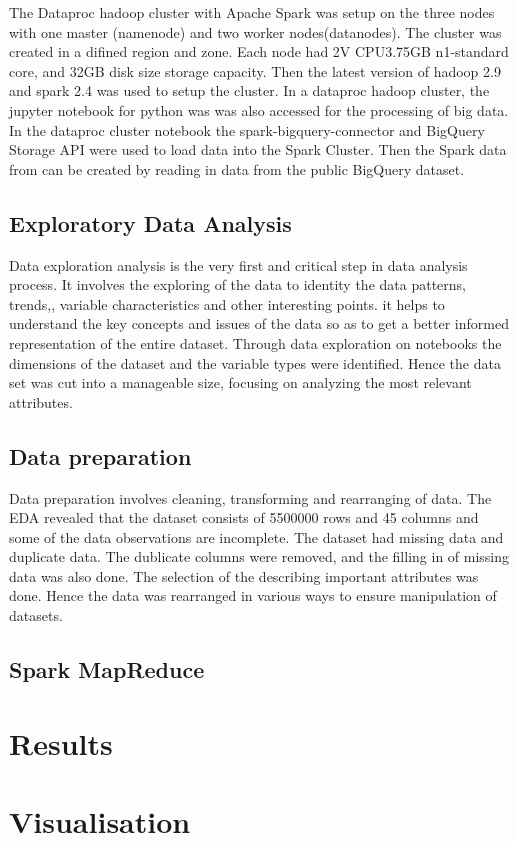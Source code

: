 \documentclass[12pt,letterpaper, twoside]{article}
\begin{document}
The Dataproc hadoop cluster with Apache Spark was setup on the three nodes with one master (namenode) and two worker nodes(datanodes). The cluster was created in a difined region and zone. Each node had 2V CPU3.75GB n1-standard core, and 32GB disk size storage capacity. Then the latest version of hadoop 2.9 and spark 2.4 was used to setup the cluster. In a dataproc hadoop cluster, the jupyter notebook for python was was also accessed for the processing of big data.  In the dataproc cluster notebook the spark-bigquery-connector and BigQuery Storage API were used to  load data into the Spark Cluster. Then the Spark data from can be created by reading in data from the public BigQuery dataset. 

\subsection{ Exploratory Data Analysis}
Data exploration analysis is the very first and critical step in data analysis process. It involves the exploring of the data to identity the data patterns, trends,, variable characteristics and other interesting points. it helps to understand the key concepts and issues of the data so as to get a better informed representation of the entire dataset. Through data exploration on notebooks the dimensions of the dataset and the variable types were identified. Hence the data set was cut into a manageable size, focusing on analyzing the most relevant attributes.  

\subsection{Data preparation}
Data preparation involves cleaning, transforming and rearranging of data. The EDA revealed that the dataset consists of 5500000 rows and 45 columns and some of the data observations are incomplete. The dataset had missing data and duplicate data. The dublicate columns were removed, and the filling in of missing data was also done. The selection of the describing important  attributes was done. Hence the data was rearranged in various ways to ensure  manipulation of datasets. 


\subsection{ Spark MapReduce}


\section{Results}
\section{Visualisation}
\end{document}
